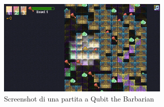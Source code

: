 \documentclass{book}
\theoremstyle{definition}
\theoremstyle{definition}
\theoremstyle{definition}
\theoremstyle{plain}
\theoremstyle{plain}
\theoremstyle{plain}
\theoremstyle{plain}
\begin{document}
\begin{figure}[H]
\captionsetup{font=scriptsize}
\begin{center}
    \includegraphics[width=0.73\textwidth]{Immagini troppo complicate/qubit_the_barbarian_screenshot.png}
\end{center}
\caption{\scriptsize Screenshot di una partita a Qubit the Barbarian\cite{wootton_puzzle}}\label{fig:img_qubit_the_barbarian}
\end{figure}
\end{document}
